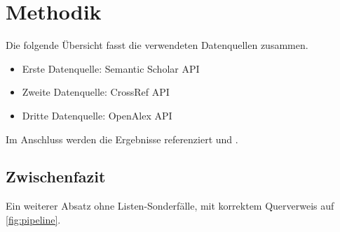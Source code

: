 \providecommand{\tightlist}{%
  \setlength{\itemsep}{0pt}\setlength{\parskip}{0pt}}

\chapter{Methodik}

Die folgende Übersicht fasst die verwendeten Datenquellen zusammen.

\begin{itemize}
\tightlist
\item Erste Datenquelle: Semantic Scholar API
\item Zweite Datenquelle: CrossRef API
\item Dritte Datenquelle: OpenAlex API
\end{itemize}

Im Anschluss werden die Ergebnisse referenziert \cite{smith2020} und
\citep[S.~12]{jones2019}.

\section{Zwischenfazit}

Ein weiterer Absatz ohne Listen-Sonderfälle, mit korrektem Querverweis
auf \ref{fig:pipeline}.
